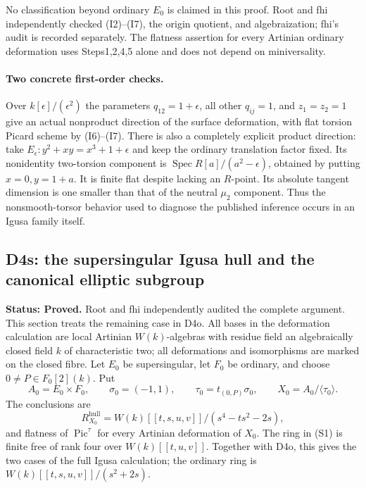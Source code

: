 No classification beyond ordinary $E_0$ is claimed in this proof. Root and fhi independently checked (I2)--(I7), the origin quotient, and algebraization; fhi's audit is recorded separately. The flatness assertion for every Artinian ordinary deformation uses Steps1,2,4,5 alone and does not depend on miniversality.

\paragraph{Two concrete first-order checks.}
Over $k[\epsilon]/(\epsilon^2)$ the parameters $q_{12}=1+\epsilon$, all other $q_{ij}=1$, and $z_1=z_2=1$ give an actual nonproduct direction of the surface deformation, with flat torsion Picard scheme by (I6)--(I7). There is also a completely explicit product direction: take $E_\epsilon:y^2+xy=x^3+1+\epsilon$ and keep the ordinary translation factor fixed. Its nonidentity two-torsion component is $\operatorname{Spec}R[a]/(a^2-\epsilon)$, obtained by putting $x=0,y=1+a$. It is finite flat despite lacking an $R$-point. Its absolute tangent dimension is one smaller than that of the neutral $\mu_2$ component. Thus the nonsmooth-torsor behavior used to diagnose the published inference occurs in an Igusa family itself.


\subsection*{D4s: the supersingular Igusa hull and the canonical elliptic subgroup}
\textbf{Status: Proved.} Root and fhi independently audited the complete argument.
This section treats the remaining case in D4o. All bases in the
deformation calculation are local Artinian $W(k)$-algebras with residue
field an algebraically closed field $k$ of characteristic two; all
deformations and isomorphisms are marked on the closed fibre. Let
$E_0$ be supersingular, let $F_0$ be ordinary, and choose
$0\ne P\in F_0[2](k)$. Put
\[
 A_0=E_0\times F_0,\qquad \sigma_0=(-1,1),\qquad
 \tau_0=t_{(0,P)}\sigma_0,\qquad X_0=A_0/\langle\tau_0\rangle.
\]
The conclusions are
\[
 R_{X_0}^{\mathrm{hull}}
   =W(k)[[t,s,u,v]]/(s^4-ts^2-2s),                       \tag{S1}
\]
and flatness of $\operatorname{Pic}^{\tau}$ for every Artinian
deformation of $X_0$. The ring in (S1) is finite free of rank four over
$W(k)[[t,u,v]]$. Together with D4o, this gives the two cases of the full
Igusa calculation; the ordinary ring is
$W(k)[[t,s,u,v]]/(s^2+2s)$.

